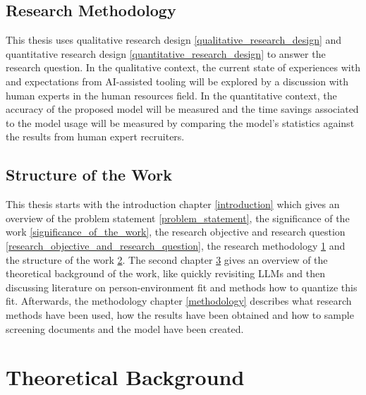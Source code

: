 \documentclass[draft,final]{thesisclass} %
\begin{document}
\section{Research Methodology} \label{research_methodology}
This thesis uses qualitative research design \ref{qualitative_research_design} and quantitative research design \ref{quantitative_research_design} to answer the research question.
In the qualitative context, the current state of experiences with and expectations from \acs{AI}-assisted tooling will be explored by a discussion with human experts in the human resources field.
In the quantitative context, the accuracy of the proposed model will be measured and the time savings associated to the model usage will be measured by comparing the model's statistics against the results from human expert recruiters.

\section{Structure of the Work} \label{structure_of_the_work}
This thesis starts with the introduction chapter \ref{introduction} which gives an overview of the problem statement \ref{problem_statement}, the significance of the work \ref{significance_of_the_work}, the research objective and research question \ref{research_objective_and_research_question}, the research methodology \ref{research_methodology} and the structure of the work \ref{structure_of_the_work}.
The second chapter \ref{theoretical_background} gives an overview of the theoretical background of the work, like quickly revisiting \gls{LLM}s and then discussing literature on person-environment fit and methods how to quantize this fit.
Afterwards, the methodology chapter \ref{methodology} describes what research methods have been used, how the results have been obtained and how to sample screening documents and the model have been created.


\chapter{Theoretical Background} \label{theoretical_background}
\end{document}
